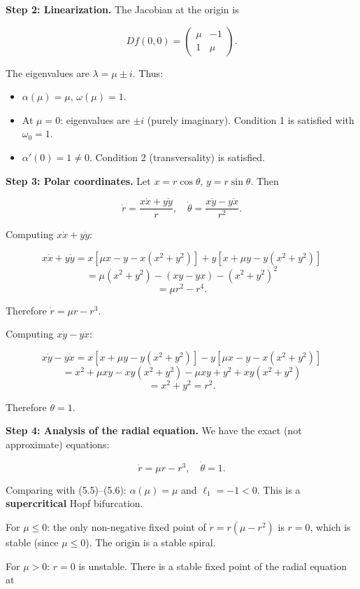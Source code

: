 \textbf{Step 2: Linearization.} The Jacobian at the origin is

\[
Df(0, 0) = \begin{pmatrix} \mu & -1 \\ 1 & \mu \end{pmatrix}.
\]

The eigenvalues are $\lambda = \mu \pm i$. Thus:
\begin{itemize}[nosep]
  \item $\alpha(\mu) = \mu$, $\omega(\mu) = 1$.
  \item At $\mu = 0$: eigenvalues are $\pm i$ (purely imaginary). Condition 1 is satisfied with $\omega_0 = 1$.
  \item $\alpha'(0) = 1 \neq 0$. Condition 2 (transversality) is satisfied.
\end{itemize}

\textbf{Step 3: Polar coordinates.} Let $x = r\cos\theta$, $y = r\sin\theta$. Then

\[
\dot{r} = \frac{x\dot{x} + y\dot{y}}{r}, \quad \dot{\theta} = \frac{x\dot{y} - y\dot{x}}{r^2}.
\]

Computing $x\dot{x} + y\dot{y}$:

\[
x\dot{x} + y\dot{y} = x[\mu x - y - x(x^2 + y^2)] + y[x + \mu y - y(x^2 + y^2)]
\]
\[
= \mu(x^2 + y^2) - (xy - yx) - (x^2 + y^2)^2
\]
\[
= \mu r^2 - r^4.
\]

Therefore $\dot{r} = \mu r - r^3$.

Computing $x\dot{y} - y\dot{x}$:

\[
x\dot{y} - y\dot{x} = x[x + \mu y - y(x^2 + y^2)] - y[\mu x - y - x(x^2 + y^2)]
\]
\[
= x^2 + \mu xy - xy(x^2 + y^2) - \mu xy + y^2 + xy(x^2 + y^2)
\]
\[
= x^2 + y^2 = r^2.
\]

Therefore $\dot{\theta} = 1$.

\textbf{Step 4: Analysis of the radial equation.} We have the exact (not approximate) equations:

\[
\dot{r} = \mu r - r^3, \quad \dot{\theta} = 1.
\]

Comparing with (5.5)--(5.6): $\alpha(\mu) = \mu$ and $\ell_1 = -1 < 0$. This is a \textbf{supercritical} Hopf bifurcation.

For $\mu \leq 0$: the only non-negative fixed point of $\dot{r} = r(\mu - r^2)$ is $r = 0$, which is stable (since $\mu \leq 0$). The origin is a stable spiral.

For $\mu > 0$: $r = 0$ is unstable. There is a stable fixed point of the radial equation at

